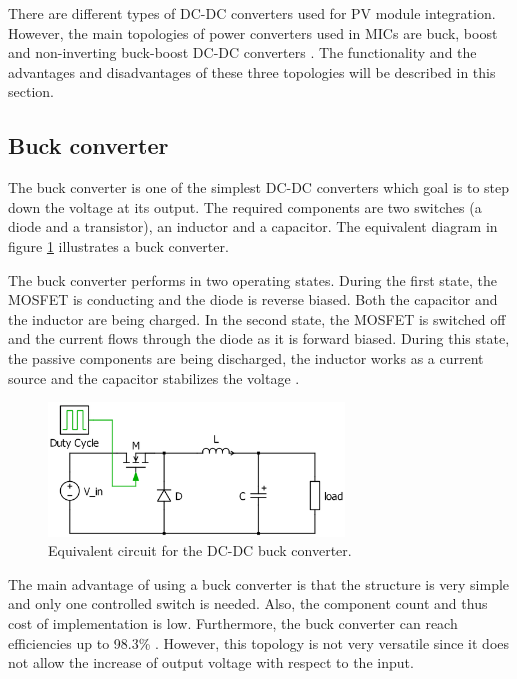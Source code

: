 There are different types of DC-DC converters used for PV module integration. However, the main topologies of power converters used in MICs are buck, boost and non-inverting buck-boost DC-DC converters \cite{advantagebuckboost}. The functionality and the advantages and disadvantages of these three topologies will be described in this section.

\subsection{Buck converter\label{Buck-C}}

The buck converter is one of the simplest DC-DC converters which goal is to step down the voltage at its output. The required components are two switches (a diode and a transistor), an inductor and a capacitor. The equivalent diagram in figure \ref{Buck-converter} illustrates a buck converter.

The buck converter performs in two operating states. 
During the first state, the MOSFET is conducting and the diode is reverse biased. %
Both the capacitor and the inductor are being charged. In the second state, the MOSFET is switched off and the current flows through the diode as it is forward biased. During this state, the passive components are being discharged, the inductor works as a current source and the capacitor stabilizes the voltage \cite{schematicbuckandboost}.

\begin{figure}[H]
	\begin{center}
		\includegraphics[width=0.7\textwidth]{../Pictures/Buck-converter}
		\caption{Equivalent circuit for the DC-DC buck converter.}
		\label{Buck-converter}
	\end{center}	
\end{figure}

The main advantage of using a buck converter is that the structure is very simple and only one controlled  switch is needed. Also, the component count and thus cost of implementation is low. Furthermore, the buck converter can reach efficiencies up to 98.3\% \cite{Efficiencybuck}. However, this topology is not very versatile since it does not allow the increase of output voltage with respect to the input.


